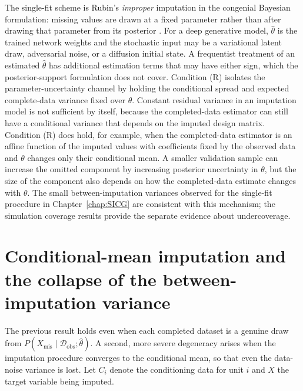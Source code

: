 \begin{remark}\label{rem:improper-mi}
The single-fit scheme is Rubin's \emph{improper} imputation in the congenial Bayesian formulation: missing values are drawn at a fixed parameter rather than after drawing that parameter from its posterior \citep{robins2000inference}. For a deep generative model, $\hat\theta$ is the trained network weights and the stochastic input may be a variational latent draw, adversarial noise, or a diffusion initial state. A frequentist treatment of an estimated $\hat\theta$ has additional estimation terms that may have either sign, which the posterior-support formulation does not cover. Condition (R) isolates the parameter-uncertainty channel by holding the conditional spread and expected complete-data variance fixed over $\theta$. Constant residual variance in an imputation model is not sufficient by itself, because the completed-data estimator can still have a conditional variance that depends on the imputed design matrix. Condition (R) does hold, for example, when the completed-data estimator is an affine function of the imputed values with coefficients fixed by the observed data and $\theta$ changes only their conditional mean. A smaller validation sample can increase the omitted component by increasing posterior uncertainty in $\theta$, but the size of the component also depends on how the completed-data estimate changes with $\theta$. The small between-imputation variances observed for the single-fit procedure in Chapter~\ref{chap:SICG} are consistent with this mechanism; the simulation coverage results provide the separate evidence about undercoverage.
\end{remark}

\section{Conditional-mean imputation and the collapse of the between-imputation variance}\label{app:mean-collapse}

The previous result holds even when each completed dataset is a genuine draw from $P(X_{\mathrm{mis}}\mid\mathcal{D}_{\mathrm{obs}};\hat{\theta})$. A second, more severe degeneracy arises when the imputation procedure converges to the conditional mean, so that even the data-noise variance is lost. Let $C_i$ denote the conditioning data for unit $i$ and $X$ the target variable being imputed.

